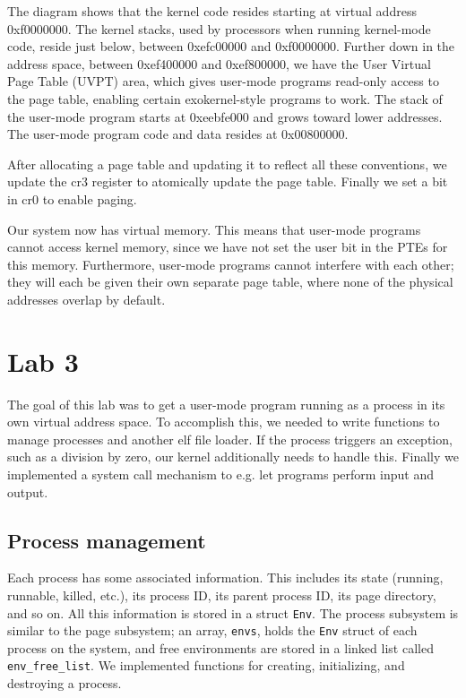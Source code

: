 \documentclass{article}
\begin{document}
The diagram shows that the kernel code resides starting at virtual address
0xf0000000. The kernel stacks, used by processors when running kernel-mode
code, reside just below, between 0xefc00000 and 0xf0000000. Further down in
the address space, between 0xef400000 and 0xef800000, we have the User Virtual
Page Table (UVPT) area, which gives user-mode programs read-only access to the
page table, enabling certain exokernel-style programs to work. The stack of
the user-mode program starts at 0xeebfe000 and grows toward lower addresses.
The user-mode program code and data resides at 0x00800000.

After allocating a page table and updating it to reflect all these
conventions, we update the \gls{cr3} register to atomically update the page
table. Finally we set a bit in \gls{cr0} to enable paging.

Our system now has virtual memory. This means that user-mode programs cannot
access kernel memory, since we have not set the user bit in the PTEs for this
memory. Furthermore, user-mode programs cannot interfere with each other; they
will each be given their own separate page table, where none of the physical
addresses overlap by default.




\section{Lab 3}

The goal of this lab was to get a user-mode program running as a process in
its own virtual address space. To accomplish this, we needed to write
functions to manage processes and another \gls{elf} file loader. If the process
triggers an exception, such as a division by zero, our kernel additionally
needs to handle this. Finally we implemented a system call mechanism to e.g.
let programs perform input and output.

\subsection{Process management}
Each process has some associated information. This includes its state
(running, runnable, killed, etc.), its process ID, its parent process ID, its
page directory, and so on. All this information is stored in a struct
\texttt{Env}. The process subsystem is similar to the page subsystem; an
array, \texttt{envs}, holds the \texttt{Env} struct of each process on the
system, and free environments are stored in a linked list called
\texttt{env\_free\_list}. We implemented functions for creating, initializing,
and destroying a process.
\end{document}
